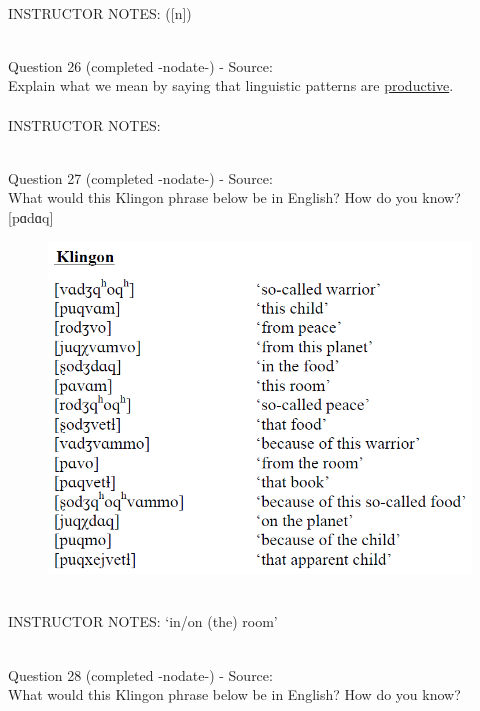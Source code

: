 \documentclass[12pt]{article}
\begin{document}
~\\
INSTRUCTOR NOTES: ([n])


~\\

{\large Question 26} (completed -nodate-) - Source: \\

Explain what we mean by saying that linguistic patterns are \underline{productive}.\\


~\\
INSTRUCTOR NOTES: 


~\\

{\large Question 27} (completed -nodate-) - Source: \\

What would this Klingon phrase below be in English? How do you know?\\

{[pɑdɑq]}

\begin{figure}[H]
\includegraphics{../images/klingon.png}
\end{figure}

~\\
INSTRUCTOR NOTES: ‘in/on (the) room’


~\\

{\large Question 28} (completed -nodate-) - Source: \\

What would this Klingon phrase below be in English? How do you know?\\
\end{document}
